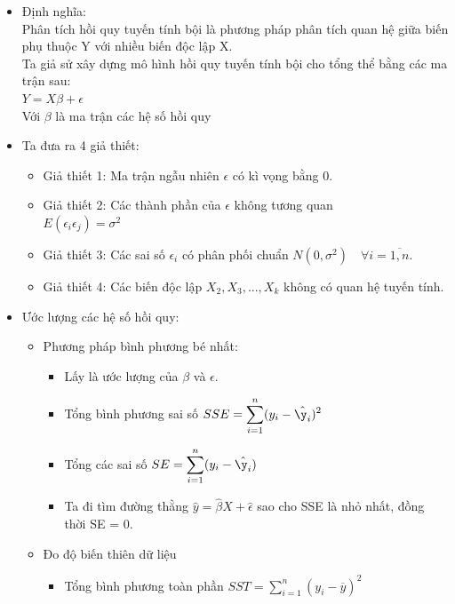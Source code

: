 \documentclass[a4paper]{article}
\theoremstyle{definition}
\begin{document}
\begin{itemize}
	\item Định nghĩa:\\
	Phân tích hồi quy tuyến tính bội là phương pháp phân tích quan hệ giữa biến phụ thuộc Y với nhiều biến độc lập X.\\
	Ta giả sử xây dựng mô hình hồi quy tuyến tính bội cho tổng thể bằng các ma trận sau:\\
		$Y=X\beta+\epsilon$\\
	Với $\beta$ là ma trận các hệ số hồi quy
\item Ta đưa ra 4 giả thiết:
\begin{itemize}
    \item Giả thiết 1: Ma trận ngẫu nhiên $\epsilon$ có kì vọng bằng 0.\\
    \item Giả thiết 2: Các thành phần của $\epsilon$ không tương quan\\ 
    $E(\epsilon_i\epsilon_j)=\sigma^2$\\
    \item Giả thiết 3: Các sai số $\epsilon_i$ có phân phối chuẩn $N(0,\sigma^2)\quad \forall i=\overline{1,n}$.\\
	\item 	Giả thiết 4: Các biến độc lập $X_2, X_3,..., X_k$ không có quan hệ tuyến tính.\\
\end{itemize}
\item Ước lượng các hệ số hồi quy:
\begin{itemize}
    \item Phương pháp bình phương bé nhất:
    \begin{itemize}
    \item Lấy  là ước lượng của $\beta$ và $\epsilon$.
        \item Tổng bình phương sai số $SSE=\displaystyle\sum_{i=1}^{n}(y_i-\hat{\y_i})^2$
        \item Tổng các sai số $SE=\displaystyle\sum_{i=1}^{n}(y_i-\hat{\y_i})$
        \item Ta đi tìm đường thằng $\hat{y}=\hat{\beta}X+\hat{\epsilon}$ sao cho SSE là nhỏ nhất, đồng thời SE = 0.
    \end{itemize}
    \item Đo độ biến thiên dữ liệu
    \begin{itemize}
        \item Tổng bình phương toàn phần $SST=\displaystyle\sum_{i=1}^{n}(y_i-\overline{y})^2$

\end{itemize}
\end{itemize}
\end{itemize}
\end{document}
